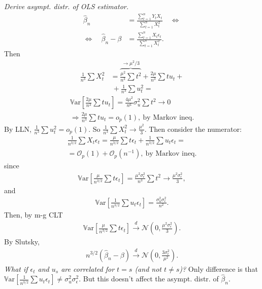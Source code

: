 \documentclass[9pt]{extarticle}
\newcommand{\var}{\mathbb{V}\text{ar}}
\newcommand{\OO}{\mathcal{O}}
\newcommand{\darrow}{\overset{d}{\rightarrow}}
\begin{document}
\begin{multicols*}{4}
\emph{Derive asympt. distr. of OLS estimator.}
\begin{align*}
    \hat{\beta}_n &= \frac{\sum_{t=1}^n Y_t X_t}{\sum_{t=1}^n X_t^2} \quad \Leftrightarrow \\
    \Leftrightarrow \quad \hat{\beta}_n - \beta &= \frac{\sum_{t=1}^n X_t \epsilon_t}{\sum_{t=1}^n X_t^2}.
\end{align*}
Then
\begin{align*}
    \frac{1}{n^3} \sum X_t^2 &= \overbrace{\frac{\mu^2}{n^3} \sum t^2}^{\rightarrow \mu^2/3} + \frac{2 \mu}{n^3} \sum t u_t + \\ 
    & ~ + \frac{1}{n^3} \sum u_t^2 =
\end{align*}
\begin{gather*}
    \var[\frac{2 \mu}{n^3}\sum t u_t] = \frac{4 \mu^2}{n^6} \sigma_u^2 \sum t^2 \rightarrow 0 \\
    \Rightarrow \frac{2 \mu}{n^3}\sum t u_t = o_p(1), ~\text{by Markov ineq.}
\end{gather*}
By LLN, $\frac{1}{n^3} \sum u_t^2 = o_p(1)$. So $\frac{1}{n^3} \sum X_t^2 \rightarrow \frac{\mu^2}{3}$. Then consider the numerator:
\begin{gather*}
    \frac{1}{n^{3/2}} {\textstyle \sum} X_t \epsilon_t = \frac{\mu}{n^{3/2}} {\textstyle \sum} t \epsilon_t + \frac{1}{n^{3/2}} {\textstyle \sum} u_t \epsilon_t = \\
    = \OO_p(1) + \OO_p(n^{-1}), ~\text{by Markov ineq.}
\end{gather*}
since
\begin{gather*}
    \var[\frac{\mu}{n^{3/2}} \sum t \epsilon_t] = \frac{\mu^2\sigma_\epsilon^2}{n^{3}} \sum t^2 \rightarrow \frac{\mu^2 \sigma_\epsilon^2}{3},
\end{gather*}
and
\begin{gather*}
    \var[\frac{1}{n^{3/2}} \sum u_t \epsilon_t] = \frac{\sigma_u^2 \sigma_\epsilon^2}{n^2}.
\end{gather*}
Then, by m-g CLT
\begin{align*}
    \var[\frac{\mu}{n^{3/2}} \sum t \epsilon_t] \darrow \mathcal{N}(0, \frac{\mu^2 \sigma_\epsilon^2}{3}).
\end{align*}
By Slutsky,
\begin{gather*}
    n^{3/2}(\hat{\beta}_n - \beta) \darrow \mathcal{N}(0, \frac{3\sigma_\epsilon^2}{\mu^2}).
\end{gather*}
\emph{What if $\epsilon_t$ and $u_s$ are correlated for $t = s$ (and not $t \neq s$)?} Only difference is that $\var[\frac{1}{n^{3/2}} \sum u_t \epsilon_t] \neq \sigma_u^2 \sigma_\epsilon^2$. But this doesn't affect the asympt. distr. of $\hat{\beta}_n$.


\end{multicols*}
\end{document}

